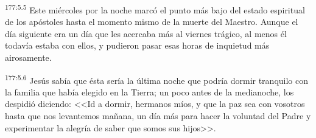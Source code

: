 \par 
\textsuperscript{177:5.5} Este miércoles por la noche marcó el punto más bajo del estado espiritual de los apóstoles hasta el momento mismo de la muerte del Maestro. Aunque el día siguiente era un día que les acercaba más al viernes trágico, al menos él todavía estaba con ellos, y pudieron pasar esas horas de inquietud más airosamente.

\par 
\textsuperscript{177:5.6} Jesús sabía que ésta sería la última noche que podría dormir tranquilo con la familia que había elegido en la Tierra; un poco antes de la medianoche, los despidió diciendo: <<Id a dormir, hermanos míos, y que la paz sea con vosotros hasta que nos levantemos mañana, un día más para hacer la voluntad del Padre y experimentar la alegría de saber que somos sus hijos>>.